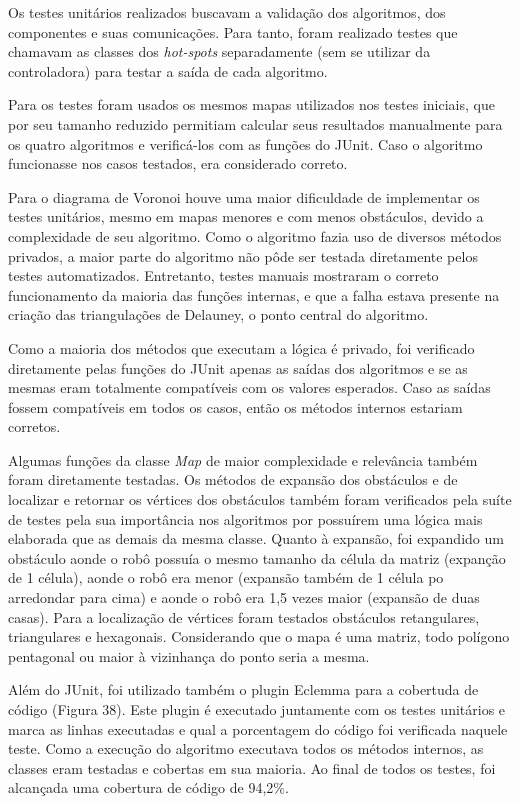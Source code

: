 Os testes unitários realizados buscavam a validação dos algoritmos, dos componentes e suas comunicações. Para tanto, foram realizado testes que chamavam as classes dos \textit{hot-spots} separadamente (sem se utilizar da controladora) para testar a saída de cada algoritmo.

Para os testes foram usados os mesmos mapas utilizados nos testes iniciais, que por seu tamanho reduzido permitiam calcular seus resultados manualmente para os quatro algoritmos e verificá-los com as funções do JUnit. Caso o algoritmo funcionasse nos casos testados, era considerado correto.

Para o diagrama de Voronoi houve uma maior dificuldade de implementar os testes unitários, mesmo em mapas menores e com menos obstáculos, devido a complexidade de seu algoritmo. Como o algoritmo fazia uso de diversos métodos privados, a maior parte do algoritmo não pôde ser testada diretamente pelos testes automatizados. Entretanto, testes manuais mostraram o correto funcionamento da maioria das funções internas, e que a falha estava presente na criação das triangulações de Delauney, o ponto central do algoritmo.

Como a maioria dos métodos que executam a lógica é privado, foi verificado diretamente pelas funções do JUnit apenas as saídas dos algoritmos e se as mesmas eram totalmente compatíveis com os valores esperados. Caso as saídas fossem compatíveis em todos os casos, então os métodos internos estariam corretos.

Algumas funções da classe \textit{Map} de maior complexidade e relevância também foram diretamente testadas. Os métodos de expansão dos obstáculos e de localizar e retornar os vértices dos obstáculos também foram verificados pela suíte de testes pela sua importância nos algoritmos por possuírem uma lógica mais elaborada que as demais da mesma classe. Quanto à expansão, foi expandido um obstáculo aonde o robô possuía o mesmo tamanho da célula da matriz (expanção de 1 célula), aonde o robô era menor (expansão também de 1 célula po arredondar para cima) e aonde o robô era 1,5 vezes maior (expansão de duas casas). Para a localização de vértices foram testados obstáculos retangulares, triangulares e hexagonais. Considerando que o mapa é uma matriz, todo polígono pentagonal ou maior à vizinhança do ponto seria a mesma.

Além do JUnit, foi utilizado também o plugin Eclemma para a cobertuda de código (Figura 38). Este plugin é executado juntamente com os testes unitários e marca as linhas executadas e qual a porcentagem do código foi verificada naquele teste. Como a execução do algoritmo executava todos os métodos internos, as classes eram testadas e cobertas em sua maioria. Ao final de todos os testes, foi alcançada uma cobertura de código de 94,2\%.

